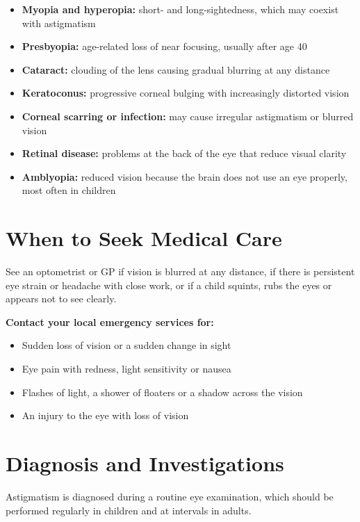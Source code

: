\begin{itemize}
    \item \textbf{Myopia and hyperopia:} short- and long-sightedness, which may coexist with astigmatism
    \item \textbf{Presbyopia:} age-related loss of near focusing, usually after age 40
    \item \textbf{Cataract:} clouding of the lens causing gradual blurring at any distance
    \item \textbf{Keratoconus:} progressive corneal bulging with increasingly distorted vision
    \item \textbf{Corneal scarring or infection:} may cause irregular astigmatism or blurred vision
    \item \textbf{Retinal disease:} problems at the back of the eye that reduce visual clarity
    \item \textbf{Amblyopia:} reduced vision because the brain does not use an eye properly, most often in children
\end{itemize}

\section*{When to Seek Medical Care}
See an optometrist or GP if vision is blurred at any distance, if there is persistent eye strain or headache with close work, or if a child squints, rubs the eyes or appears not to see clearly.

\textbf{Contact your local emergency services for:}
\begin{itemize}
    \item Sudden loss of vision or a sudden change in sight
    \item Eye pain with redness, light sensitivity or nausea
    \item Flashes of light, a shower of floaters or a shadow across the vision
    \item An injury to the eye with loss of vision
\end{itemize}

\section*{Diagnosis and Investigations}
Astigmatism is diagnosed during a routine eye examination, which should be performed regularly in children and at intervals in adults.

